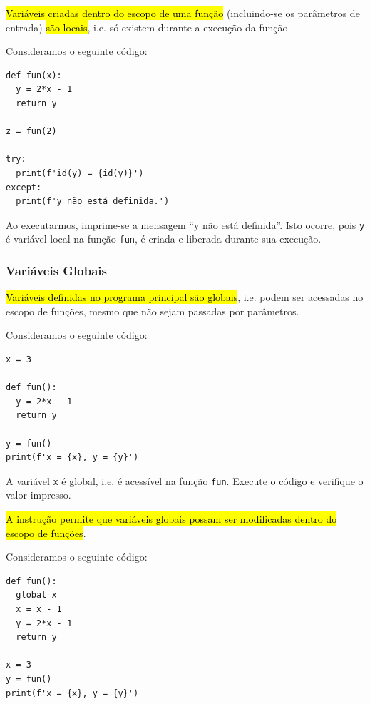 \hl{Variáveis criadas dentro do escopo de uma função} (incluindo-se os parâmetros de entrada) \hl{são locais}, i.e. só existem durante a execução da função.

\begin{ex}
  Consideramos o seguinte código:

\begin{lstlisting}
def fun(x):
  y = 2*x - 1
  return y

z = fun(2)

try:
  print(f'id(y) = {id(y)}')
except:
  print(f'y não está definida.')
\end{lstlisting}
  
Ao executarmos, imprime-se a mensagem ``y não está definida''. Isto ocorre, pois \lstinline+y+ é variável local na função \lstinline+fun+, é criada e liberada durante sua execução.
\end{ex}

\subsubsection{Variáveis Globais}

\hl{Variáveis definidas no programa principal são globais}, i.e. podem ser acessadas no escopo de funções, mesmo que não sejam passadas por parâmetros.

\begin{ex}
  Consideramos o seguinte código:

\begin{lstlisting}
x = 3

def fun():
  y = 2*x - 1
  return y

y = fun()
print(f'x = {x}, y = {y}')
\end{lstlisting}
  
A variável \lstinline+x+ é global, i.e. é acessível na função \lstinline+fun+. Execute o código e verifique o valor impresso.
\end{ex}

\hl{A instrução {\PYTHONglobal} permite que variáveis globais possam ser modificadas dentro do escopo de funções}.

\begin{ex}
  Consideramos o seguinte código:

\begin{lstlisting}
def fun():
  global x
  x = x - 1
  y = 2*x - 1
  return y

x = 3
y = fun()
print(f'x = {x}, y = {y}')
\end{lstlisting}

\end{ex}

